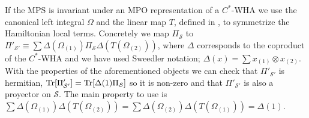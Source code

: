 \documentclass[a4paper,twocolumn,11pt,accepted=2023-02-10]{quantumarticle}
\newcommand{\tr}{{\rm Tr}}
\begin{document}
If the MPS is invariant under an MPO representation of a ${C}^*$-WHA we use the canonical left integral $\Omega$ and the linear map $T$, defined in \cite{molnar22}, to symmetrize the Hamiltonian local terms. Concretely we map $\Pi_{\mathcal{S}}$ to $\Pi'_{\mathcal{S}'} \equiv \sum \Delta(\Omega_{(1)}) \Pi_{\mathcal{S}} \Delta(T(\Omega_{(2)}))$, where $\Delta$ corresponds to the coproduct of the ${C}^*$-WHA and we have used Sweedler notation; $\Delta(x)=\sum x_{(1)}\otimes x_{(2)}$.  With the properties of the aforementioned objects we can check that $\Pi'_{\mathcal{S}'}$ is hermitian, $\tr[\Pi'_{\mathcal{S}'}] =\tr[ \Delta(1) \Pi_{\mathcal{S}}]$ so it is non-zero and that $\Pi'_{\mathcal{S}'}$ is also a proyector on $\mathcal{S}$. The main property to use is $\sum \Delta(\Omega_{(1)}) \Delta(T(\Omega_{(2)})) = \sum \Delta(\Omega_{(2)}) \Delta(T(\Omega_{(1)})) = \Delta(1)$. 






\end{document}
